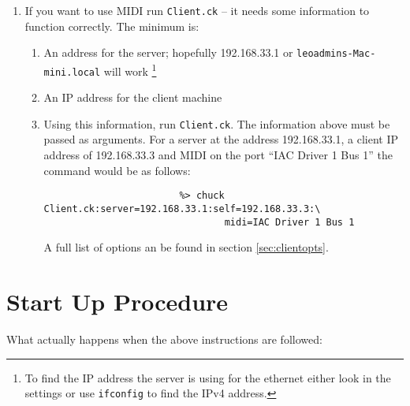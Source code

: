 \documentclass[11pt]{article}
\begin{document}
\begin{enumerate} [\bf 1.]
\begin{enumerate} [\bf i.]
		\item {If you want to use MIDI run \texttt{Client.ck} -- it needs some information to function correctly.
			  The minimum is: }
		\begin{enumerate} [\bf a.]
			\item{An address for the server; hopefully 192.168.33.1 or \texttt{leoadmins-Mac-mini.local} will work
			\footnote{ To find the IP address the server is using for the ethernet either look in the settings or use \verb+ifconfig+
			to find the IPv4 address.}}
			\item{An IP address for the client machine}
			\item Using this information, run \texttt{Client.ck}. The information above must be passed as arguments. For a server at the address 
				192.168.33.1, a client IP address of 192.168.33.3 and MIDI on the port ``IAC Driver 1 Bus 1'' the command would be as follows:
				\begin{verbatim}
					    %> chuck Client.ck:server=192.168.33.1:self=192.168.33.3:\
					            midi=IAC Driver 1 Bus 1
				\end{verbatim}
				A full list of options an be found in section \ref{sec:clientopts}.
		\end{enumerate}
	\end{enumerate}

\end{enumerate}

\section{Start Up Procedure}
\label{sec:startupproc}
What actually happens when the above instructions are followed:
\end{document}
